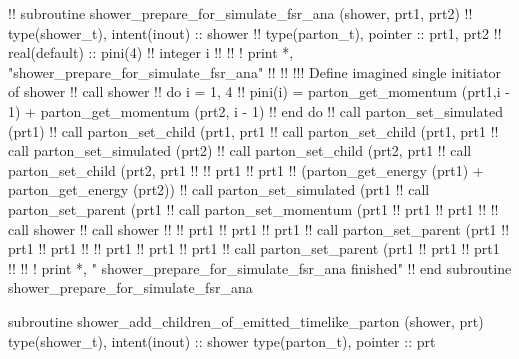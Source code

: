 \eatline
\nwendcode{}\nwdocspar
\nwenddocs{}\plusendmoddef
  !! subroutine shower_prepare_for_simulate_fsr_ana (shower, prt1, prt2)
  !!   type(shower_t), intent(inout) :: shower
  !!   type(parton_t), pointer :: prt1, prt2
  !!   real(default) ::  pini(4)
  !!   integer i
  !!
  !!   ! print *, "shower_prepare_for_simulate_fsr_ana"
  !!
  !!   !!! Define imagined single initiator of shower
  !!   call shower%
  !!   do i = 1, 4
  !!      pini(i) = parton_get_momentum (prt1,i - 1) + parton_get_momentum (prt2, i - 1)
  !!   end do
  !!   call parton_set_simulated (prt1)
  !!   call parton_set_child (prt1, prt1%
  !!   call parton_set_child (prt1, prt1%
  !!   call parton_set_simulated (prt2)
  !!   call parton_set_child (prt2, prt1%
  !!   call parton_set_child (prt2, prt1%
  !!
  !!   prt1%
  !!   prt1%
  !!        (parton_get_energy (prt1) + parton_get_energy (prt2))
  !!   call parton_set_simulated (prt1%
  !!   call parton_set_parent (prt1%
  !!   call parton_set_momentum (prt1%
  !!   prt1%
  !!   prt1%
  !!
  !!   call shower%
  !!   call shower%
  !!
  !!   prt1%
  !!   prt1%
  !!   prt1%
  !!   call parton_set_parent (prt1%
  !!   prt1%
  !!   prt1%
  !!
  !!   prt1%
  !!   prt1%
  !!   prt1%
  !!   call parton_set_parent (prt1%
  !!   prt1%
  !!   prt1%
  !!
  !!   ! print *, "  shower_prepare_for_simulate_fsr_ana finished"
  !! end subroutine shower_prepare_for_simulate_fsr_ana

\eatline
\nwendcode{}\nwdocspar
\nwenddocs{}\plusendmoddef
  subroutine shower_add_children_of_emitted_timelike_parton (shower, prt)
    type(shower_t), intent(inout) :: shower
    type(parton_t), pointer :: prt

